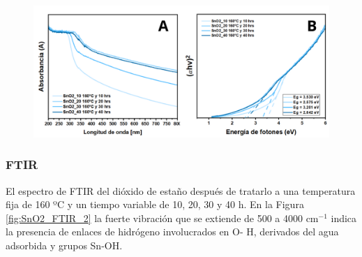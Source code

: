 \documentclass[12pt]{article}
\begin{document}
\begin{figure}[H]
    	   \begin{center}
     	  	\includegraphics[width = 1\textwidth]{Imagenes/tt.png}
    	   \end{center} 
        \end{figure}

\subsubsection{FTIR}

El espectro de FTIR del dióxido de estaño después de tratarlo a una temperatura fija de 160 ºC y un tiempo variable de 10, 20, 30 y 40 h. En la  Figura \ref{fig:SnO2_FTIR_2} la fuerte vibración que se extiende de 500 a 4000 cm$\displaystyle ^{-1}$ indica la presencia de enlaces de hidrógeno involucrados en O- H, derivados del agua adsorbida y grupos Sn-OH.\vspace{1em} %
\end{document}
